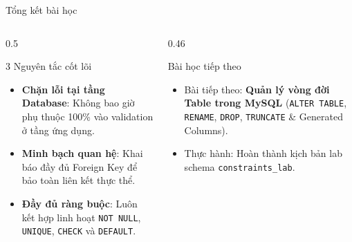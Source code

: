 \documentclass[aspectratio=169,11pt]{beamer}
\newcommand{\kw}[1]{\textcolor{dbblue}{\textbf{#1}}}
\begin{document}
\begin{frame}{Tổng kết bài học}
\begin{columns}[t]
  \begin{column}{0.5\textwidth}
    \begin{block}{3 Nguyên tắc cốt lõi}
      \begin{itemize}\setlength{\itemsep}{2pt}
        \item \kw{Chặn lỗi tại tầng Database}: Không bao giờ phụ thuộc 100\% vào validation ở tầng ứng dụng.
        \item \kw{Minh bạch quan hệ}: Khai báo đầy đủ Foreign Key để bảo toàn liên kết thực thể.
        \item \kw{Đầy đủ ràng buộc}: Luôn kết hợp linh hoạt \texttt{NOT NULL}, \texttt{UNIQUE}, \texttt{CHECK} và \texttt{DEFAULT}.
      \end{itemize}
    \end{block}
  \end{column}
  \begin{column}{0.46\textwidth}
    \begin{exampleblock}{Bài học tiếp theo}
      \begin{itemize}\setlength{\itemsep}{2pt}
        \item Bài tiếp theo: \textbf{Quản lý vòng đời Table trong MySQL} (\texttt{ALTER TABLE}, \texttt{RENAME}, \texttt{DROP}, \texttt{TRUNCATE} \& Generated Columns).
        \item Thực hành: Hoàn thành kịch bản lab schema \texttt{constraints\_lab}.
      \end{itemize}
    \end{exampleblock}
  \end{column}
\end{columns}
\end{frame}
\end{document}
